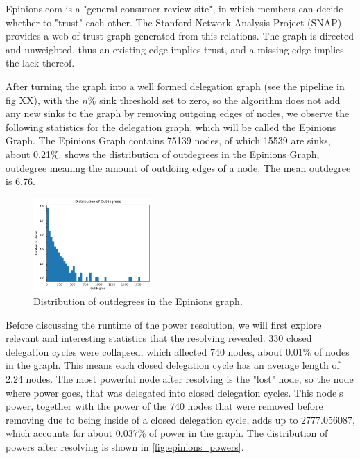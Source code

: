Epinions.com is a "general consumer review site", in which members can decide whether to "trust" each other.  The Stanford Network Analysis Project (SNAP) provides a web-of-trust graph generated from this relations.  The graph is directed and unweighted, thus an existing edge implies trust, and a missing edge implies the lack thereof.

After turning the graph into a well formed delegation graph (see the pipeline in fig XX), with the $n\%$ sink threshold set to zero, so the algorithm does not add any new sinks to the graph by removing outgoing edges of nodes, we observe the following statistics for the delegation graph, which will be called the Epinions Graph. The Epinions Graph contains 75139 nodes, of which 15539 are sinks, about 0.21\%.  shows the distribution of outdegrees in the Epinions Graph, outdegree meaning the amount of outdoing edges of a node. The mean outdegree is 6.76.

\begin{figure}[h]
    \centering
    \includegraphics[width=0.4\textwidth]{epinions_outdegree_distr}
    \caption{Distribution of outdegrees in the Epinions graph.}
    \label{fig:epinions_outdegrees}
\end{figure}

Before discussing the runtime of the power resolution, we will first explore relevant and interesting statistics that the resolving revealed. 330 closed delegation cycles were collapsed, which affected 740 nodes, about 0.01\% of nodes in the graph. This means each closed delegation cycle has an average length of 2.24 nodes. The most powerful node after resolving is the "lost" node, so the node where power goes, that was delegated into closed delegation cycles. This node's power, together with the power of the 740 nodes that were removed before removing due to being inside of a closed delegation cycle, adds up to 2777.056087, which accounts for about 0.037\% of power in the graph. The distribution of powers after resolving is shown in \cref{fig:epinions_powers}.

